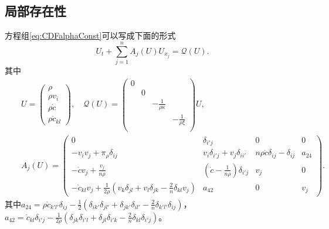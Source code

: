 	\subsection{局部存在性}
	方程组\eqref{eq:CDFalphaConst}可以写成下面的形式
	\begin{equation*}
		U_t + \sum_{j=1}^n A_j(U) U_{x_j} = \mathcal{Q}(U).
	\end{equation*}
	其中
	\begin{eqnarray*} 
		&& U =\left( \begin{array}{cccc} 
			\rho \\ \rho v_i \\ \rho \dot{c} \\ \rho \mathring{c}_{kl}
		\end{array}\right), \quad 
		\mathcal{Q}(U) = 
		\left( \begin{array}{cccc} 
			0 & & & \\
			& 0 & & \\
			& &  -\frac{1}{\rho \kappa} & \\
			& & & -\frac{1}{\rho\xi}  \\
 		\end{array}\right) U, \\%
	 		&&  A_{j}(U) =
 		\left( \begin{matrix} 
 		0 & \delta_{i'j} & 0 & 0  \\
 		-v_i v_j  + \pi_\rho \delta_{ij} & v_i \delta_{i'j} + v_j \delta_{ii'}   &  n \rho \dot{c} \delta_{ij} - \delta_{ij} & a_{24}  \\
 		-\dot{c} v_j + \frac{v_j}{n \rho} & (\dot{c} - \frac{1}{n \rho}) \delta_{i'j} &  v_j & 0 \\
 		-\mathring{c}_{kl} v_j + \frac{1}{2 \rho} (v_k \delta_{jl} + v_l \delta_{jk} - \frac{2}{n} \delta_{kl} v_j) & a_{42} & 0 & v_j 
 		\end{matrix} \right).
	\end{eqnarray*}
	其中$a_{24}=\rho \mathring{c}_{k'l'} \delta_{ij}- \frac{1}{2}(\delta_{ik'}\delta_{jl'} + \delta_{jk'}\delta_{il'} - \frac{2}{n} \delta_{k'l'} \delta_{ij})$，$a_{42} =  \mathring{c}_{kl} \delta_{i'j}  - \frac{1}{2\rho} (\delta_{jk} \delta_{i'l} +　\delta_{jl} \delta_{i'k} - \frac{2}{n} \delta_{kl} \delta_{i'j})$。

